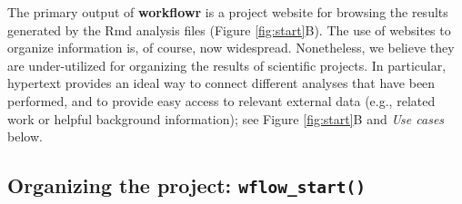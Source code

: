 \documentclass[9pt,a4paper]{extarticle}
\begin{document}
The primary output of \textbf{workflowr} is a project website for browsing the
results generated by the Rmd analysis files (Figure \ref{fig:start}B). The use of
websites to organize information is, of course, now widespread.
Nonetheless, we believe they are under-utilized for organizing the
results of scientific projects. In particular, hypertext provides an
ideal way to connect different analyses that have been performed, and to
provide easy access to relevant external data (e.g., related work or
helpful background information); see Figure \ref{fig:start}B and \textit{Use cases}
below.

\subsection*{Organizing the project: \texttt{wflow\_start()}}
\end{document}
